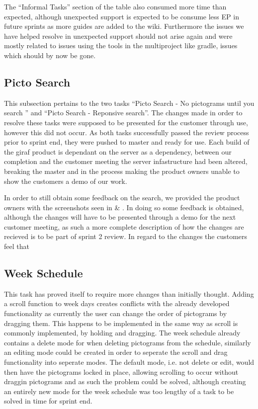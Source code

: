 The ``Informal Tasks'' section of the table also consumed more time than expected, although unexpected support is expected to be consume less EP in future sprints as more guides are added to the wiki.
Furthermore the issues we have helped resolve in unexpected support should not arise again and were mostly related to issues using the tools in the multiproject like gradle, issues which should by now be gone.

\subsection{Picto Search}
This subsection pertains to the two tasks ``Picto Search - No pictograms until you search '' and ``Picto Search - Reponsive search''.
The changes made in order to resolve these tasks were supposed to be presented for the customer through use, however this did not occur.
As both tasks successfully passed the review process prior to sprint end, they were pushed to master and ready for use.
Each build of the giraf product is dependant on the server as a dependency, between our completion and the customer meeting the server infastructure had been altered, breaking the master and in the process making the product owners unable to show the customers a demo of our work.

In order to still obtain some feedback on the search, we provided the product owners with the screenshots seen in  \& .
In doing so some feedback is obtained, although the changes will have to be presented through a demo for the next customer meeting, as such a more complete description of how the changes are recieved is to be part of sprint 2 review.
\bigskip
\noindent
In regard to the changes the customers feel that

\subsection{Week Schedule}
This task has proved itself to require more changes than initially thought.
Adding a scroll function to week days creates conflicts with the already developed functionality as currently the user can change the order of pictograms by dragging them.
This happens to be implemented in the same way as scroll is commonly implemented, by holding and dragging.
The week schedule already contains a delete mode for when deleting pictograms from the schedule, similarly an editing mode could be created in order to seperate the scroll and drag functionality into seperate modes.
The default mode, i.e. not delete or edit, would then have the pictograms locked in place, allowing scrolling to occur without draggin pictograms and as such the problem could be solved, although creating an entirely new mode for the week schedule was too lengthy of a task to be solved in time for sprint end.